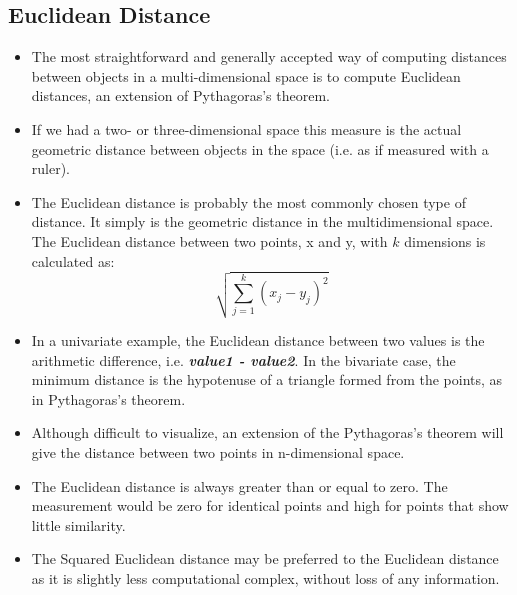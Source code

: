 \documentclass[a4paper,12pt]{report}
\begin{document}
\subsection{Euclidean Distance}
\begin{itemize}
	\item The most straightforward and generally accepted way of computing distances between objects in a multi-dimensional space is to compute Euclidean distances, an extension of Pythagoras's theorem.
	\item If we had a two- or three-dimensional space this measure is the actual geometric distance between objects in the space (i.e. as if measured with a ruler).
	\item The Euclidean distance is probably the most commonly chosen type of distance. It simply is the geometric distance in the multidimensional space. The Euclidean distance between two points, x and y, with $k$ dimensions is calculated as:
	\[ \sqrt{ \sum^{k}_{j=1} ( x_j - y_j)^2 } \]
	
	\item 
	In a univariate example, the Euclidean distance between two values is the arithmetic difference, i.e. \textbf{\textit{value1 - value2}}. In the bivariate case, the minimum distance is the hypotenuse of a triangle formed from the points, as in Pythagoras's theorem.
	\item Although difficult to visualize, an extension of the Pythagoras's theorem will give the distance between two points in n-dimensional space. 
	
	\item 
	The Euclidean distance is always greater than or equal to zero. The measurement would be zero for identical points and high for points that show little similarity.
\item	The Squared Euclidean distance may be preferred to the Euclidean distance as it is slightly less computational complex, without loss of any information.
\end{itemize}




\end{document}
